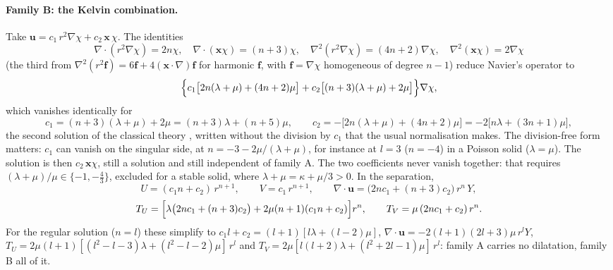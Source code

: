 \documentclass[11pt]{article}
\numberwithin{equation}{section}
\newcommand{\vu}{\mathbf{u}}
\newcommand{\vx}{\mathbf{x}}
\begin{document}
\paragraph{Family B: the Kelvin combination.} Take
$\vu = c_1\,r^2\nabla\chi + c_2\,\vx\,\chi$. The identities
\begin{equation}
  \nabla\cdot(r^2\nabla\chi) = 2n\chi,\quad
  \nabla\cdot(\vx\chi) = (n+3)\chi,\quad
  \nabla^2(r^2\nabla\chi) = (4n+2)\nabla\chi,\quad
  \nabla^2(\vx\chi) = 2\nabla\chi
\end{equation}
(the third from $\nabla^2(r^2\mathbf f) = 6\mathbf f + 4(\vx\cdot\nabla)
\mathbf f$ for harmonic $\mathbf f$, with $\mathbf f=\nabla\chi$ homogeneous
of degree $n-1$) reduce Navier's operator to
\begin{equation}
  \Bigl\{c_1\bigl[2n(\lambda+\mu)+(4n+2)\mu\bigr]
       + c_2\bigl[(n+3)(\lambda+\mu)+2\mu\bigr]\Bigr\}\nabla\chi ,
\end{equation}
which vanishes identically for
\begin{equation}
  c_1 = (n+3)(\lambda+\mu)+2\mu = (n+3)\lambda+(n+5)\mu,
  \qquad
  c_2 = -\bigl[2n(\lambda+\mu)+(4n+2)\mu\bigr] = -2\bigl[n\lambda+(3n+1)\mu\bigr],
  \label{eq:kelvin}
\end{equation}
the second solution of the classical theory \cite{Love1927}, written
without the division by $c_1$ that the usual normalisation makes. The
division-free form matters: $c_1$ can vanish on the singular side, at
$n = -3-2\mu/(\lambda+\mu)$, for instance at $l=3$ ($n=-4$) in a Poisson
solid ($\lambda=\mu$). The solution is then $c_2\,\vx\chi$, still a solution
and still independent of family A. The two coefficients never vanish
together: that requires $(\lambda+\mu)/\mu\in\{-1,-\tfrac43\}$, excluded
for a stable solid, where $\lambda+\mu=\kappa+\mu/3>0$. In the separation,
\begin{equation}
  U = (c_1 n + c_2)\,r^{n+1},\qquad V = c_1\,r^{n+1},\qquad
  \nabla\cdot\vu = \bigl(2nc_1+(n+3)c_2\bigr)\,r^{n}\,Y,
\end{equation}
\begin{equation}
  T_U = \Bigl[\lambda\bigl(2nc_1+(n+3)c_2\bigr)
              + 2\mu(n+1)(c_1n+c_2)\Bigr]r^{n},
  \qquad
  T_V = \mu\,(2nc_1+c_2)\,r^{n}.
  \label{eq:familyB}
\end{equation}
For the regular solution ($n=l$) these simplify to
$c_1l+c_2=(l+1)[l\lambda+(l-2)\mu]$,
$\nabla\cdot\vu = -2(l+1)(2l+3)\mu\,r^lY$,
$T_U=2\mu(l+1)[(l^2-l-3)\lambda+(l^2-l-2)\mu]\,r^l$ and
$T_V=2\mu[l(l+2)\lambda+(l^2+2l-1)\mu]\,r^l$: family A carries no
dilatation, family B all of it.
\end{document}
